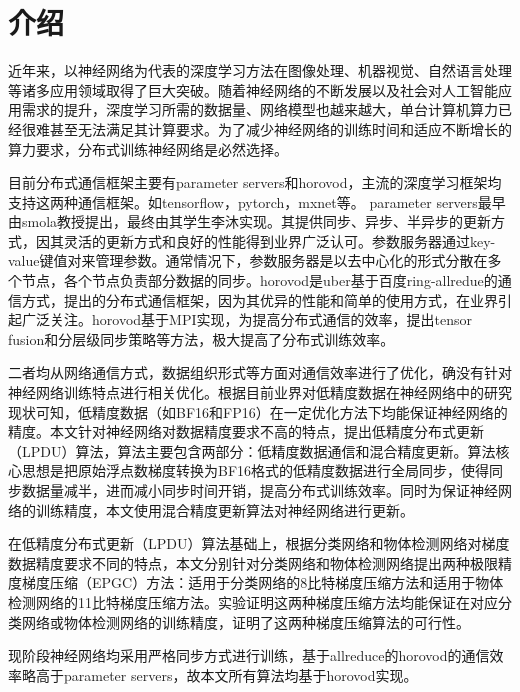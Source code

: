\chapter{介绍}
近年来，以神经网络为代表的深度学习方法在图像处理、机器视觉、自然语言处理等诸多应用领域取得了巨大突破。随着神经网络的不断发展以及社会对人工智能应用需求的提升，深度学习所需的数据量、网络模型也越来越大，单台计算机算力已经很难甚至无法满足其计算要求。为了减少神经网络的训练时间和适应不断增长的算力要求，分布式训练神经网络是必然选择。

目前分布式通信框架主要有parameter servers和horovod，主流的深度学习框架均支持这两种通信框架。如tensorflow，pytorch，mxnet等。
parameter servers最早由smola教授提出，最终由其学生李沐实现。其提供同步、异步、半异步的更新方式，因其灵活的更新方式和良好的性能得到业界广泛认可。参数服务器通过key-value键值对来管理参数。通常情况下，参数服务器是以去中心化的形式分散在多个节点，各个节点负责部分数据的同步。horovod是uber基于百度ring-allredue的通信方式，提出的分布式通信框架，因为其优异的性能和简单的使用方式，在业界引起广泛关注。horovod基于MPI实现，为提高分布式通信的效率，提出tensor fusion和分层级同步策略等方法，极大提高了分布式训练效率。 

二者均从网络通信方式，数据组织形式等方面对通信效率进行了优化，确没有针对神经网络训练特点进行相关优化。根据目前业界对低精度数据在神经网络中的研究现状可知，低精度数据（如BF16和FP16）在一定优化方法下均能保证神经网络的精度。本文针对神经网络对数据精度要求不高的特点，提出低精度分布式更新（LPDU）算法，算法主要包含两部分：低精度数据通信和混合精度更新。算法核心思想是把原始浮点数梯度转换为BF16格式的低精度数据进行全局同步，使得同步数据量减半，进而减小同步时间开销，提高分布式训练效率。同时为保证神经网络的训练精度，本文使用混合精度更新算法对神经网络进行更新。

在低精度分布式更新（LPDU）算法基础上，根据分类网络和物体检测网络对梯度数据精度要求不同的特点，本文分别针对分类网络和物体检测网络提出两种极限精度梯度压缩（EPGC）方法：适用于分类网络的8比特梯度压缩方法和适用于物体检测网络的11比特梯度压缩方法。实验证明这两种梯度压缩方法均能保证在对应分类网络或物体检测网络的训练精度，证明了这两种梯度压缩算法的可行性。

现阶段神经网络均采用严格同步方式进行训练，基于allreduce的horovod的通信效率略高于parameter servers，故本文所有算法均基于horovod实现。


